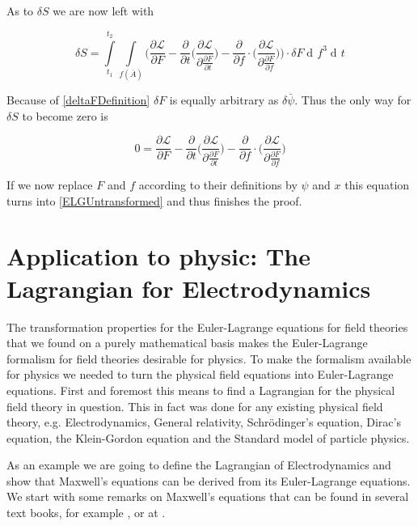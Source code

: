 \documentclass{article}
\DeclareMathOperator{\dd}{d\!}
\begin{document}
\noindent As to $\delta S$ we are now left with


\begin{equation}
\delta S = \int\limits_{t_1}^{t_2} \int\limits_{f(\bar{A})} 
\bigg(
\frac{\partial \mathcal{L}}{\partial F}
-\frac{\partial}{\partial t} \bigg( \frac{\partial \mathcal{L}}{\partial \frac{\partial F}{\partial t}} \bigg) 
-\frac{\partial}{\partial f} \cdot \bigg( \frac{\partial \mathcal{L}}{\partial \frac{\partial F}{\partial f}} \bigg)\bigg) \cdot \delta F
\dd f^3 \dd t
\end{equation}

Because of \ref{deltaFDefinition} $\delta F$ is equally arbitrary as $\delta \bar{\psi}$. Thus the only way for $\delta S$ to become zero is

\begin{equation} \label{lastEqToProveInvariance}
0 = 
\frac{\partial \mathcal{L}}{\partial F}
-\frac{\partial}{\partial t} \bigg( \frac{\partial \mathcal{L}}{\partial \frac{\partial F}{\partial t}} \bigg) 
-\frac{\partial}{\partial f} \cdot \bigg( \frac{\partial \mathcal{L}}{\partial \frac{\partial F}{\partial f}} \bigg)
\end{equation}

If we now replace $F$ and $f$ according to their definitions by $\psi$ and $x$ this equation turns into \ref{ELGUntransformed} and thus finishes the proof.




\section{Application to physic: The Lagrangian for Electrodynamics}
The transformation properties for the Euler-Lagrange equations for field theories that we found on a purely mathematical basis makes the Euler-Lagrange formalism for field theories desirable for physics.
To make the formalism available for physics we needed to turn the physical field equations into Euler-Lagrange equations.
First and foremost this means to find a Lagrangian for the physical field theory in question.
This in fact was done for any existing physical field theory, e.g. Electrodynamics, General relativity, Schr\"odinger's equation, Dirac's equation, the Klein-Gordon equation and the Standard model of particle physics.

As an example we are going to define the Lagrangian of Electrodynamics and show that Maxwell's equations can be derived from its Euler-Lagrange equations. We start with some remarks on Maxwell's equations that can be found in several text books, for example \cite{Jackson}, or at \cite{Stackexchange}.
\end{document}
